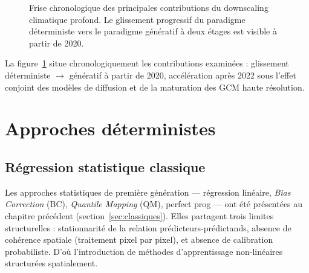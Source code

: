 \documentclass[14pt,a4paper,openany]{extreport}
\theoremstyle{definition}
\newcommand{\Oracle}{\textsc{Oracle}}
\begin{document}
\begin{figure}[ht]
{%
  }
  \caption{Frise chronologique des principales contributions du downscaling climatique profond. Le glissement progressif du paradigme déterministe vers le paradigme génératif à deux étages est visible à partir de 2020.}
  \label{fig:frise}
\end{figure}

La figure~\ref{fig:frise} situe chronologiquement les contributions examinées : glissement déterministe $\to$ génératif à partir de 2020, accélération après 2022 sous l'effet conjoint des modèles de diffusion et de la maturation des GCM haute résolution.

\section{Approches déterministes}
\label{sec:soa-det}

\subsection{Régression statistique classique}
\label{ssec:soa-reg-classique}

Les approches statistiques de première génération --- régression linéaire, \emph{Bias Correction} (BC), \emph{Quantile Mapping} (QM), perfect prog --- ont été présentées au chapitre précédent (section~\ref{sec:classiques}). Elles partagent trois limites structurelles : stationnarité de la relation prédicteurs-prédictands, absence de cohérence spatiale (traitement pixel par pixel), et absence de calibration probabiliste. D'où l'introduction de méthodes d'apprentissage non-linéaires structurées spatialement.
\end{document}
